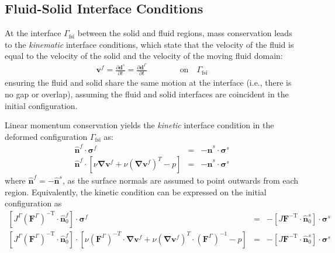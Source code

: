 \documentclass[sn-mathphys,Numbered]{sn-jnl}%
\newcommand{\bb}{\boldsymbol}
\begin{document}
\subsection{Fluid-Solid Interface Conditions} \label{sec:fsi_interface}
At the interface $\Gamma_\text{fsi}$ between the solid and fluid regions, mass conservation leads to the \emph{kinematic} interface conditions, which state that the velocity of the fluid is equal to the velocity of the solid and the velocity of the moving fluid domain:
\begin{eqnarray} \label{eqn:kinematic}
	\bb{v}^f = \frac{\partial \bb{d}^s}{\partial t} = \frac{\partial \bb{d}^\Gamma}{\partial t}
	\quad\quad\quad\quad\text{on}\quad \Gamma_\text{fsi}
\end{eqnarray}
ensuring the fluid and solid share the same motion at the interface (i.e., there is no gap or overlap), assuming the fluid and solid interfaces are coincident in the initial configuration.


Linear momentum conservation yields the \emph{kinetic} interface condition in the deformed configuration $\Gamma_\text{fsi}$ as:
\begin{eqnarray} \label{eqn:kinetic_deformed}
	\hat{\bb{n}}^f \cdot \bb{\sigma}^f &=& -\hat{\bb{n}}^s \cdot \bb{\sigma}^s \\
	\hat{\bb{n}}^f \cdot \left[\nu \bb{\nabla} \bb{v}^f + \nu \left(\bb{\nabla} \bb{v}^f \right)^T - p \right]
		&=& -\hat{\bb{n}}^s \cdot \bb{\sigma}^s
\end{eqnarray}
where $\hat{\bb{n}}^f = -\hat{\bb{n}}^s$, as the surface normals are assumed to point outwards from each region.
Equivalently, the kinetic condition can be expressed on the initial configuration as
\begin{eqnarray} \label{eqn:kinetic_initial}
	\left[ J^\Gamma (\bb{F}^\Gamma)^{-\text{T}} \cdot \hat{\bb{n}}_0^f \right] \cdot \bb{\sigma}^f &=&
	-\left[ J \bb{F}^{-\text{T}} \cdot \hat{\bb{n}}_0^s \right] \cdot \bb{\sigma}^s \\
	\left[ J^\Gamma (\bb{F}^\Gamma)^{-\text{T}} \cdot \hat{\bb{n}}_0^f \right]
	 \cdot 
	 \left[
	 \nu (\bb{F}^\Gamma)^{-T} \cdot \bb{\nabla} \bb{v}^f 
	 + \nu \left(\bb{\nabla} \bb{v}^f \right)^T \cdot (\bb{F}^\Gamma)^{-1}
	 - p
	 \right]
	&=& 
	-\left[ J \bb{F}^{-\text{T}} \cdot \hat{\bb{n}}_0^s \right] \cdot \bb{\sigma}^s
\end{eqnarray}
\end{document}
